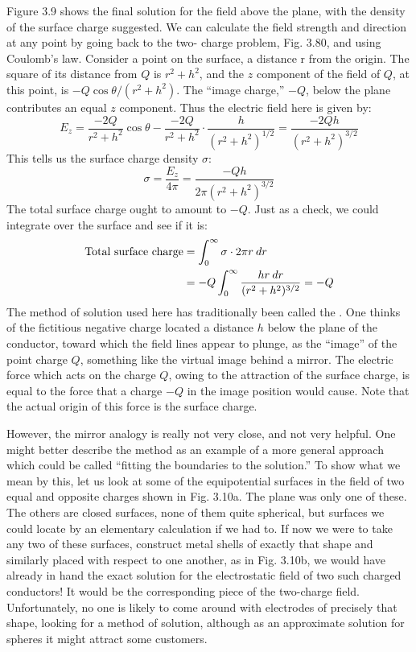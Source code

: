 Figure 3.9 shows the final solution for the field above the plane,
with the density of the surface charge suggested. We can calculate
the field strength and direction at any point by going back to the two-
charge problem, Fig. 3.80, and using Coulomb's law. Consider a
point on the surface, a distance r from the origin. The square of its
distance from $Q$ is $r^2 + h^2$, and the $z$ component of the field of $Q$,
at this point, is $-Q \cos \theta/(r^2 + h^2)$. The ``image charge,'' $-Q$,
below the plane contributes an equal $z$ component. Thus the electric
field here is given by:
\begin{equation}
  E_z = \frac{-2Q}{r^2+h^2}\cos\theta - \frac{-2Q}{r^2+h^2}\cdot\frac{h}{(r^2+h^2)^{1/2}}
       = \frac{-2Qh}{(r^2+h^2)^{3/2}}
\end{equation}
This tells us the surface charge density $\sigma$:
\begin{equation}
  \sigma = \frac{E_z}{4\pi}  = \frac{-Qh}{2\pi(r^2+h^2)^{3/2}}
\end{equation}
The total surface charge ought to amount to $-Q$. Just as a check,
we could integrate over the surface and see if it is:
\begin{align}
\begin{split}
  \text{Total surface charge} &= \int_0^\infty \sigma\cdot2\pi r\:d r \\
           &= -Q \int_0^\infty \frac{hr\:d r}{(r^2+h^2)^{3/2}} = -Q
\end{split}
\end{align}
The method of solution used here has traditionally been called
the . One thinks of the fictitious negative charge
located a distance $h$ below the plane of the conductor, toward which
the field lines appear to plunge, as the ``image'' of the point charge $Q$,
something like the virtual image behind a mirror. The electric force
which acts on the charge $Q$, owing to the attraction of the surface
charge, is equal to the force that a charge $-Q$ in the image position
would cause. Note that the actual origin of this force is the surface
charge.

However, the mirror analogy is really not very close, and not very
helpful. One might better describe the method as an example of a
more general approach which could be called ``fitting the boundaries
to the solution.'' To show what we mean by this, let us look at some
of the equipotential surfaces in the field of two equal and opposite
charges shown in Fig. 3.10a. The plane was only one of these. The
others are closed surfaces, none of them quite spherical, but surfaces
we could locate by an elementary calculation if we had to. If now
we were to take any two of these surfaces, construct metal shells of
exactly that shape and similarly placed with respect to one another,
as in Fig. 3.10b, we would have already in hand the exact solution
for the electrostatic field of two such charged conductors! It would
be the corresponding piece of the two-charge field. Unfortunately,
no one is likely to come around with electrodes of precisely that
shape, looking for a method of solution, although as an approximate
solution for spheres it might attract some customers.

